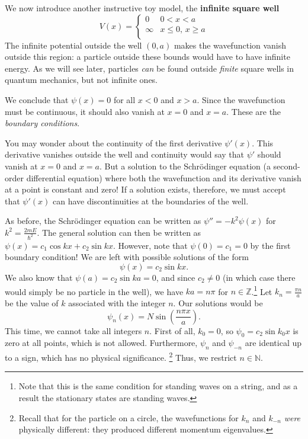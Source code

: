We now introduce another instructive toy model, the \textbf{infinite square well} $$V(x)=
\begin{cases} 
      0 & 0<x<a \\
      \infty & x\leq 0,\,x\geq a\\
   \end{cases}$$The infinite potential outside the well $(0,a)$ makes the wavefunction vanish outside this region: a particle outside these bounds would have to have infinite energy. As we will see later, particles \textit{can} be found outside \textit{finite} square wells in quantum mechanics, but not infinite ones.
   
We conclude that $\psi(x)=0$ for all $x<0$ and $x>a$. Since the wavefunction must be continuous, it should also vanish at $x=0$ and $x=a$. These are the \textit{boundary conditions}.

\begin{framedrmk*}
    You may wonder about the continuity of the first derivative $\psi'(x)$. This derivative vanishes outside the well and continuity would say that $\psi'$ should vanish at $x=0$ and $x=a$. But a solution to the Schrödinger equation (a second-order differential equation) where both the wavefunction and its derivative vanish at a point is constant and zero! If a solution exists, therefore, we must accept that $\psi'(x)$ can have discontinuities at the boundaries of the well.
\end{framedrmk*}

As before, the Schrödinger equation can be written as $\psi''=-k^2\psi(x)$ for $k^2=\frac{2mE}{\hbar^2}$. The general solution can then be written as $\psi(x)=c_1\cos kx+c_2\sin kx$. However, note that $\psi(0)=c_1=0$ by the first boundary condition! We are left with possible solutions of the form $$\psi(x)=c_2\sin kx.$$We also know that $\psi(a)=c_2\sin ka=0$, and since $c_2\neq 0$ (in which case there would simply be no particle in the well), we have $ka=n\pi$ for $n\in\mathbb{Z}$.\footnote{Note that this is the same condition for standing waves on a string, and as a result the stationary states are standing waves.} Let $k_n=\frac{\pi n}{a}$ be the value of $k$ associated with the integer $n$. Our solutions would be $$\psi_n(x)=N\sin(\frac{n\pi x}{a}).$$This time, we cannot take all integers $n$. First of all, $k_0=0$, so $\psi_0=c_2\sin k_0x$ is zero at all points, which is not allowed. Furthermore, $\psi_n$ and $\psi_{-n}$ are identical up to a sign, which has no physical significance. \footnote{Recall that for the particle on a circle, the wavefunctions for $k_n$ and $k_{-n}$ \textit{were} physically different: they produced different momentum eigenvalues.} Thus, we restrict $n\in\mathbb{N}$. 

